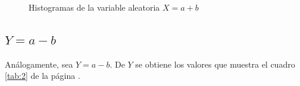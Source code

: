 \documentclass{article}
\begin{document}
\begin{figure}[H]
\centering
{}
\label{fig:a}
\centering
{}
\label{fig:s}
\centering
\caption{Histogramas de la variable aleatoria $X= a + b$ }
\label{fig:1} 
\end{figure}

\subsection{$Y = a - b$}
Análogamente, sea $Y= a-b$. De $Y$ se obtiene los valores que muestra el cuadro \ref{tab:2} de la página \pageref{tab:2}.
\end{document}
